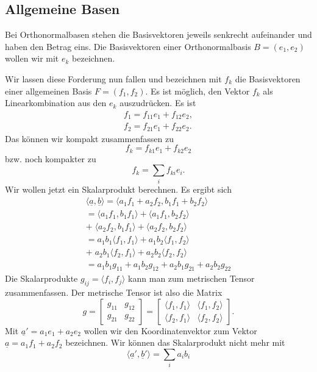 \documentclass[a4paper,10pt,fleqn,twocolumn,twoside]{article}
\begin{document}
\subsection{Allgemeine Basen}

Bei Orthonormalbasen stehen die Basisvektoren jeweils senkrecht
aufeinander und haben den Betrag eins. Die Basisvektoren einer
Orthonormalbasis $B=(e_1,e_2)$ wollen wir mit $e_k$ bezeichnen.

Wir lassen diese Forderung nun fallen und bezeichnen mit $f_k$ die
Basisvektoren einer allgemeinen Basis $F=(f_1,f_2)$. Es ist
möglich, den Vektor $f_k$ als Linearkombination aus den
$e_k$ auszudrücken. Es ist
\begin{gather*}
f_1 = f_{11}e_1+f_{12}e_2,\\
f_2 = f_{21}e_1+f_{22}e_2.
\end{gather*}
\noindent
Das können wir kompakt zusammenfassen zu
\[f_k = f_{k1}e_1+f_{k2}e_2\]
\noindent
bzw. noch kompakter zu
\[f_k = \sum_{i}f_{ki}e_i.\]
\noindent
Wir wollen jetzt ein Skalarprodukt berechnen. Es ergibt sich
\begin{gather*}
\langle\underline a,\underline b\rangle
= \langle a_1f_1+a_2f_2,b_1f_1+b_2f_2\rangle\\
= \langle a_1f_1,b_1f_1\rangle
+ \langle a_1f_1,b_2f_2\rangle\\
+\;\langle a_2f_2,b_1f_1\rangle
+ \langle a_2f_2,b_2f_2\rangle\\
= a_1b_1\langle f_1,f_1\rangle
+ a_1b_2\langle f_1,f_2\rangle\\
+\;a_2b_1\langle f_2,f_1\rangle
+ a_2b_2\langle f_2,f_2\rangle\\
= a_1b_1 g_{11} + a_1b_2 g_{12}
+ a_2b_1 g_{21} + a_2b_2 g_{22}
\end{gather*}
\noindent
Die Skalarprodukte $g_{ij} = \langle f_i,f_j\rangle$ kann man
zum metrischen Tensor zusammenfassen. Der metrische Tensor ist also
die Matrix
\[g = \begin{bmatrix}
g_{11} & g_{12}\\
g_{21} & g_{22}
\end{bmatrix}
= \begin{bmatrix}\langle f_1,f_1\rangle & \langle f_1,f_2\rangle\\
\langle f_2,f_1\rangle & \langle f_2,f_2\rangle
\end{bmatrix}.\]
\noindent
Mit $\underline a' = a_1e_1+a_2e_2$ wollen wir den
Koordinatenvektor zum Vektor $\underline a = a_1f_1+a_2f_2$
bezeichnen. Wir können das Skalarprodukt nicht mehr mit
\[\langle\underline a',\underline b'\rangle = \sum_{i}a_ib_i\]
\end{document}
